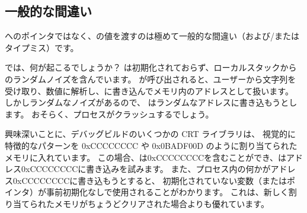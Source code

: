\subsection{一般的な間違い}

へのポインタではなく、の値を渡すのは極めて一般的な間違い（および/またはタイプミス）です。



では、何が起こるでしょうか？ 
は初期化されておらず、ローカルスタックからのランダムノイズを含んでいます。 
\scanf が呼び出されると、ユーザーから文字列を受け取り、数値に解析し、に書き込んでメモリ内のアドレスとして扱います。 
しかしランダムなノイズがあるので、 \scanf はランダムなアドレスに書き込もうとします。 
おそらく、プロセスがクラッシュするでしょう。

興味深いことに、デバッグビルドのいくつかの \ac{CRT} ライブラリは、
視覚的に特徴的なパターンを 0xCCCCCCCC や 0x0BADF00D のように割り当てられたメモリに入れています。 
この場合、は0xCCCCCCCCを含むことができ、\scanf はアドレス0xCCCCCCCCに書き込みを試みます。 
また、プロセス内の何かがアドレス0xCCCCCCCCに書き込もうとすると、
初期化されていない変数（またはポインタ）が事前初期化なしで使用されることがわかります。 
これは、新しく割り当てられたメモリがちょうどクリアされた場合よりも優れています。
